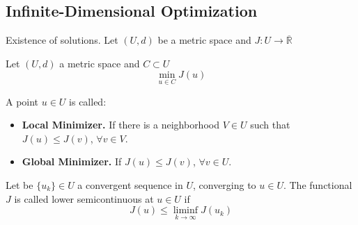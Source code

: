 \subsection{Infinite-Dimensional Optimization}
Existence of solutions. Let $(U,d)$ be a metric space and $J:U\rightarrow \overline{\mathbb{R}}$

Let $(U, d)$ a metric space and $C\subset U$
\[
	\min_{u\in C} J(u)
\]


\begin{definition}
	A point $u\in U$ is called:
	\begin{itemize}
		\item \textbf{Local Minimizer.} If there is a neighborhood $V \in U$ such that $J(u) \leq J(v)$, $\forall v \in V$.
		\item \textbf{Global Minimizer. } If $J(u)\leq J(v)$, $\forall v \in U$.
	\end{itemize}
\end{definition}
\begin{definition}
	Let be $\{u_k\} \in U$ a convergent sequence in $U$, converging to $u \in U$. The functional $J$ is called lower semicontinuous at $u\in U$ if
	\[
		J(u) \leq \liminf_{k\rightarrow\infty} J(u_k)
	\]
\end{definition}

